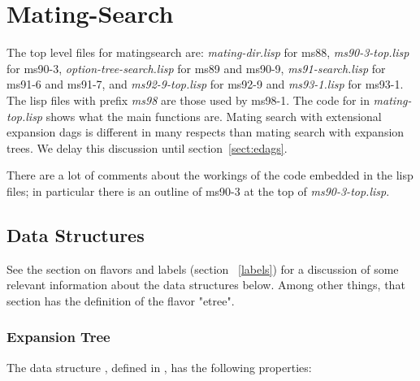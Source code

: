 \chapter{Mating-Search}

The top level files for matingsearch are:
{\it mating-dir.lisp} for ms88, 
{\it ms90-3-top.lisp} for ms90-3,
{\it option-tree-search.lisp} for ms89 and ms90-9, {\it ms91-search.lisp} for
ms91-6 and ms91-7, and {\it ms92-9-top.lisp} for ms92-9 and {\it ms93-1.lisp} 
for ms93-1.  The lisp files with prefix {\it ms98} are those used by ms98-1.
The code for  in {\it mating-top.lisp} shows 
what the main functions are.
Mating search with extensional expansion dags 
is different in many respects than mating search with expansion trees.
We delay this discussion until section~\ref{sect:edags}.

There are a lot of comments about the workings of the code embedded in the
lisp files; in particular there is an outline of ms90-3 at the top of
{\it ms90-3-top.lisp}.

\section{Data Structures}

See the section on flavors and labels (section ~\ref{labels}) for a discussion
of some relevant information about the data structures below. Among other things, 
that section has the definition of the flavor "etree".

\subsection{Expansion Tree}
\label{etrees}

The data structure , defined in 
, has the following properties:

